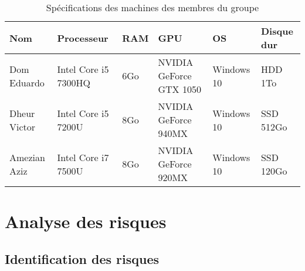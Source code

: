 \documentclass[]{article}
\begin{document}
\begin{table}[htbp]
\begin{center}
\begin{tabular}{|p{2cm}|p{3.5cm}|p{1cm}| p{5cm}| p{2cm}| p{2cm} | }
\hline
Nom & Processeur & RAM & GPU & OS & Disque dur \\
\hline\hline
Dom Eduardo & Intel Core i5 7300HQ & 6Go & NVIDIA GeForce GTX 1050 & Windows 10 & HDD 1To \\
\hline
Dheur Victor  & Intel Core i5 7200U &  8Go & NVIDIA GeForce 940MX & Windows 10 & SSD 512Go \\
\hline
Amezian Aziz  & Intel Core i7 7500U & 8Go & NVIDIA GeForce 920MX & Windows 10 &  SSD 120Go    \\
\hline
\end{tabular}
\end{center}
   \caption{Spécifications des machines des membres du groupe}
   \label{tab:TEC}
\end{table}

\newpage
\section{Analyse des risques}

\subsection{Identification des risques }\label{sec:riskident}
\end{document}
